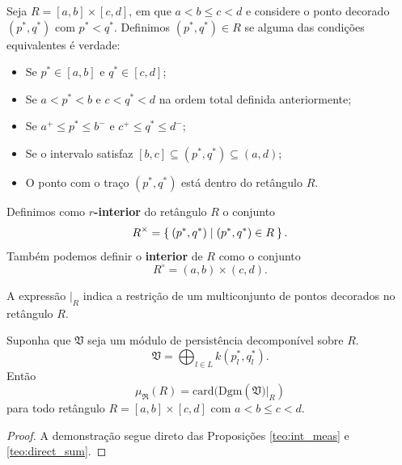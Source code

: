 \begin{defi}
    Seja $R=[a,b]\times [c,d]$, em que $a < b \leq c < d$ e considere o ponto decorado $(p^*, q^*)$ com $p^* < q^*$.
    Definimos $(p^*, q^*) \in R$ se alguma das condições equivalentes é verdade:
    \begin{itemize}
        \item Se $p^* \in [a,b]$ e $q^* \in [c,d]$;
        \item Se $a < p^* < b$ e $c < q^* < d$ na ordem total definida anteriormente;
        \item Se $a^+ \leq p^* \leq b^-$ e $c^+ \leq q^* \leq d^-$;
        \item Se o intervalo satisfaz $[b,c] \subseteq (p^*, q^*) \subseteq (a,d)$;
        \item O ponto com o traço $(p^*, q^*)$ está dentro do retângulo $R$.
    \end{itemize} 
\end{defi}

\begin{defi}
    Definimos como \textbf{$r$-interior} do retângulo $R$ o conjunto
    \begin{equation*}
        R^\times = \Set{(p^*, q^*) | (p^*, q^*) \in R}.
    \end{equation*} 
    Também podemos definir o \textbf{interior} de $R$ como o conjunto
    \begin{equation*}
        R^\circ = (a,b) \times (c,d).
    \end{equation*}
\end{defi}

A expressão $|_R$ indica a restrição de um multiconjunto de pontos decorados no retângulo $R$.

\begin{cor}
    Suponha que $\mathfrak{V}$ seja um módulo de persistência decomponível sobre $R$.
    \begin{equation*}
        \mathfrak{V} = \bigoplus_{l \in L} k(p^*_l, q^*_l).
    \end{equation*}
    Então 
    \begin{equation*}
        \mu_{\mathfrak{R}}(R) = \text{card}(\text{Dgm}(\mathfrak{V}\left.)\right|_R)
    \end{equation*}
    para todo retângulo $R = [a,b] \times [c,d]$ com $a < b \leq c < d$. 
\end{cor}
\begin{proof}
   A demonstração segue direto das Proposições \ref{teo:int_meas} e \ref{teo:direct_sum}. 
\end{proof}

